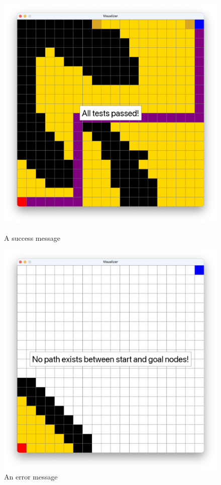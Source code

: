 \documentclass[pageno]{jpaper}
\begin{document}
\begin{figure}[hbt]
\begin{minipage}[b]{0.5\linewidth}
\centering
\includegraphics[width=.75\linewidth]{success.png}
\caption{A success message}
\label{fig:success}
\end{minipage}
\hspace{0.5cm}
\begin{minipage}[b]{0.5\linewidth}
\centering
\includegraphics[width=.75\linewidth]{failure.png}
\caption{An error message}
\label{fig:failure}
\end{minipage}
\end{figure}
\end{document}
